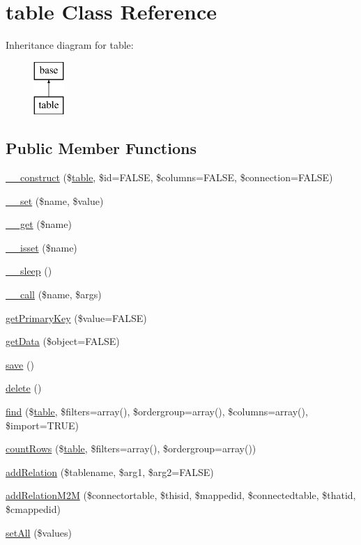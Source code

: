 \hypertarget{classtable}{
\section{table Class Reference}
\label{classtable}
}
Inheritance diagram for table:\begin{figure}[H]
\begin{center}
\leavevmode
\includegraphics[height=2.000000cm]{classtable}
\end{center}
\end{figure}
\subsection*{Public Member Functions}
\begin{DoxyCompactItemize}
\item 
\hyperlink{classtable_adb8d24f1376e0b2c5f31deb281c76385}{\_\-\_\-construct} (\$\hyperlink{classtable}{table}, \$id=FALSE, \$columns=FALSE, \$connection=FALSE)
\item 
\hyperlink{classtable_a83c2703c91959192f759992ad5640b67}{\_\-\_\-set} (\$name, \$value)
\item 
\hyperlink{classtable_abc8e9e31bb15c8a44c3210ec551407c8}{\_\-\_\-get} (\$name)
\item 
\hyperlink{classtable_a8f132f051b7cd7d570ccb9f6e2bb4201}{\_\-\_\-isset} (\$name)
\item 
\hyperlink{classtable_aaf11785905da71774e052912d784e3b4}{\_\-\_\-sleep} ()
\item 
\hyperlink{classtable_af231e86ad32039b9573ae228db5a29fa}{\_\-\_\-call} (\$name, \$args)
\item 
\hyperlink{classtable_ae671e339cdf6b77d4f8a9f6288000502}{getPrimaryKey} (\$value=FALSE)
\item 
\hyperlink{classtable_ac1eeb13dfaefd70b4c778080e5330525}{getData} (\$object=FALSE)
\item 
\hyperlink{classtable_afc8a3c62679cf00ade9f15fb2a6d6132}{save} ()
\item 
\hyperlink{classtable_a13bdffdd926f26b825ea57066334ff01}{delete} ()
\item 
\hyperlink{classtable_a54c67ef7f9e768176aedf92e3856abaa}{find} (\$\hyperlink{classtable}{table}, \$filters=array(), \$ordergroup=array(), \$columns=array(), \$import=TRUE)
\item 
\hyperlink{classtable_a456b3964c514406cc9498fc49e8c0317}{countRows} (\$\hyperlink{classtable}{table}, \$filters=array(), \$ordergroup=array())
\item 
\hyperlink{classtable_aa86daa58bc1ff877f2137c27b222dff6}{addRelation} (\$tablename, \$arg1, \$arg2=FALSE)
\item 
\hyperlink{classtable_a29c2012e7cc6b182cc3ca63acfc324b9}{addRelationM2M} (\$connectortable, \$thisid, \$mappedid, \$connectedtable, \$thatid, \$cmappedid)
\item 
\hyperlink{classtable_ac228d1f699104433c0f2679dd2dacdaf}{setAll} (\$values)
\end{DoxyCompactItemize}
